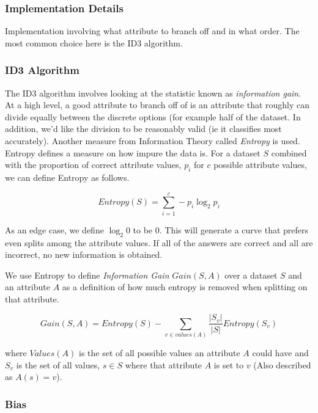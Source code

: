 \documentclass[11pt]{article}
\begin{document}
\subsubsection{Implementation Details}

Implementation involving what attribute to branch off and in what order. The most common choice here is the ID3 algorithm.

\subsubsection*{ID3 Algorithm}

The ID3 algorithm involves looking at the statistic known as \textit{information gain}. At a high level, a good attribute to branch off of is an attribute that roughly can divide equally between the discrete options (for example half of the dataset. In addition, we'd like the division to be reasonably valid (ie it classifies most accurately). Another measure from Information Theory called \textit{Entropy} is used. Entropy defines a measure on how impure the data is. For a dataset $S$ combined with the proportion of correct attribute values, $p_i$ for $c$ possible attribute values, we can define Entropy as follows.

\begin{equation}
Entropy(S) = \sum_{i=1}^{c} -p_i \log_2 p_i
\end{equation}

As an edge case, we define $\log_2 0$ to be $0$. This will generate a curve that prefers even splits among the attribute values. If all of the answers are correct and all are incorrect, no new information is obtained.

We use Entropy to define \textit{Information Gain} $Gain(S, A)$ over a dataset $S$ and an attribute $A$ as a definition of how much entropy is removed when splitting on that attribute.

\begin{equation}
Gain(S,A) = Entropy(S) - \sum_{v \in values(A)} \frac{|S_v|}{|S|} Entropy(S_v)
\end{equation}

where $Values(A)$ is the set of all possible values an attribute $A$ could have and $S_v$ is the set of all values, $s \in S$ where that attribute $A$ is set to $v$ (Also described as $A(s) = v$).

\subsubsection*{Bias}
\end{document}
